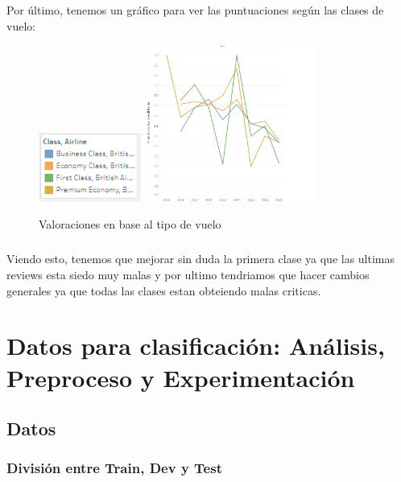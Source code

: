 \documentclass{report}
\begin{document}
            \paragraph*{}{
            Por último, tenemos un gráfico para ver las puntuaciones según las clases de vuelo:
            }
            \begin{figure}[H]
                \centering
                \includegraphics[width=0.3\textwidth]{img/Guion.png}
                \includegraphics[width=0.5\textwidth]{img/Lineas.png}
                \caption{Valoraciones en base al tipo de vuelo}
            \end{figure}

            \paragraph*{}{
            Viendo esto, tenemos que mejorar sin duda la primera clase ya que las ultimas reviews esta siedo muy malas y por ultimo tendriamos que hacer cambios generales ya que todas las clases estan obteiendo malas criticas.
            }
    \chapter{Datos para clasificación: Análisis, Preproceso y Experimentación}
        \section{Datos}
            \subsection{División entre Train, Dev y Test}
\end{document}
